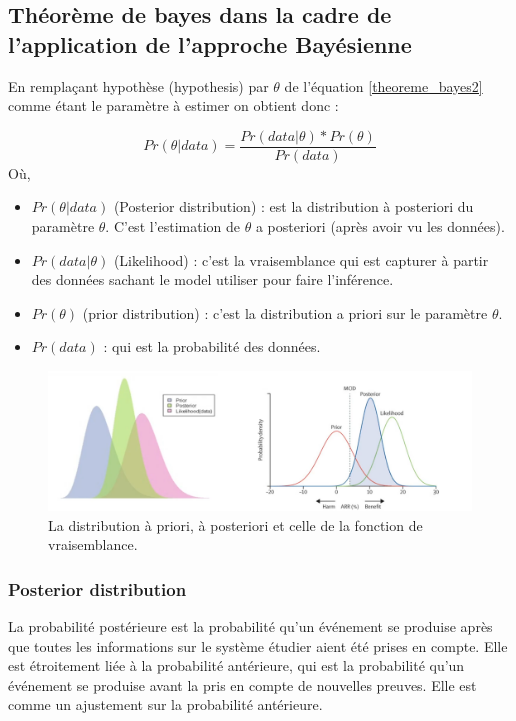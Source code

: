 \subsection{Théorème de bayes dans la cadre de l’application de l’approche Bayésienne}
En remplaçant hypothèse (hypothesis) par \(\displaystyle \theta \) de l’équation \ref{theoreme_bayes2} comme étant le paramètre à estimer on obtient donc :

\begin{equation}
	Pr(\theta|data) = \frac{Pr(data|\theta)*Pr(\theta)}{Pr(data)}
	\label{theoreme_bayes3}
\end{equation}
Où,
\begin{itemize}
    \item \(\displaystyle Pr(\theta|data) \) (Posterior distribution) : est la distribution à posteriori du paramètre \(\displaystyle \theta \). C’est l’estimation de \(\displaystyle \theta \) a posteriori (après avoir vu les données).
    \item \(\displaystyle Pr(data|\theta) \) (Likelihood) : c’est la vraisemblance qui est capturer à partir des données sachant le model utiliser pour faire l’inférence.
    \item \(\displaystyle Pr(\theta) \) (prior distribution) : c’est la distribution a priori sur le paramètre \(\displaystyle \theta \). 
    \item \(\displaystyle Pr(data) \) : qui est la probabilité des données.
\end{itemize}


\begin{figure}[H]
	\begin{center}
		\includegraphics[width=\textwidth]{images/chapitre5/prior_likelihood_posterior.png}
	\end{center}
	\caption{La distribution à priori, à posteriori et celle de la fonction de vraisemblance.}
	\label{prior_likelihood_posterior}
\end{figure}

\subsubsection{Posterior distribution}
La probabilité postérieure est la probabilité qu'un événement se produise après que toutes les informations sur le système étudier aient été prises en compte. Elle est étroitement liée à la probabilité antérieure, qui est la probabilité qu'un événement se produise avant la pris en compte de nouvelles preuves. Elle est comme un ajustement sur la probabilité antérieure.

